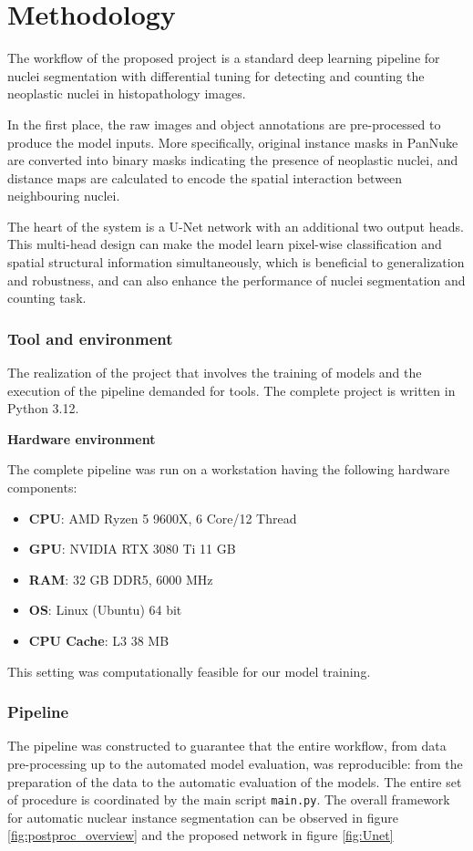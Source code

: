 \documentclass[target=bach,aauheader=,style=]{thud}
\begin{document}
\chapter{Methodology}
\label{sec:methodology}
The workflow of the proposed project is a standard deep learning pipeline for nuclei segmentation with differential tuning for detecting and counting the neoplastic nuclei in histopathology images.

In the first place, the raw images and object annotations are pre-processed to produce the model inputs. More specifically, original instance masks in PanNuke are converted into binary masks indicating the presence of neoplastic nuclei, and distance maps are calculated to encode the spatial interaction between neighbouring nuclei.

The heart of the system is a U-Net \cite{DBLP:journals/corr/RonnebergerFB15} network with an additional two output heads. This multi-head design can make the model learn pixel-wise classification and spatial structural information simultaneously, which is beneficial to generalization and robustness, and can also enhance the performance of nuclei segmentation and counting task.

\subsection{Tool and environment} The realization of the project that involves the training of models and the execution of the pipeline demanded for tools. The complete project is written in Python 3.12. \

\noindent\textbf{Hardware environment}\

\noindent The complete pipeline was run on a workstation having the following hardware components: \begin{itemize} 
    \item \textbf{CPU}: AMD Ryzen 5 9600X, 6 Core/12 Thread 
    \item \textbf{GPU}: NVIDIA RTX 3080 Ti 11 GB
    \item \textbf{RAM}: 32 GB DDR5, 6000 MHz 
    \item \textbf{OS}: Linux (Ubuntu) 64 bit 
    \item \textbf{CPU Cache}: L3 38 MB 
\end{itemize} 
This setting was computationally feasible for our model training.

\subsection{Pipeline} The pipeline was constructed to guarantee that the entire workflow, from data pre-processing up to the automated model evaluation, was reproducible: from the preparation of the data to the automatic evaluation of the models. The entire set of procedure is coordinated by the main script \texttt{main.py}. The overall framework for automatic nuclear instance segmentation can be observed in figure \ref{fig:postproc_overview} and the proposed network in figure \ref{fig:Unet}
\end{document}
